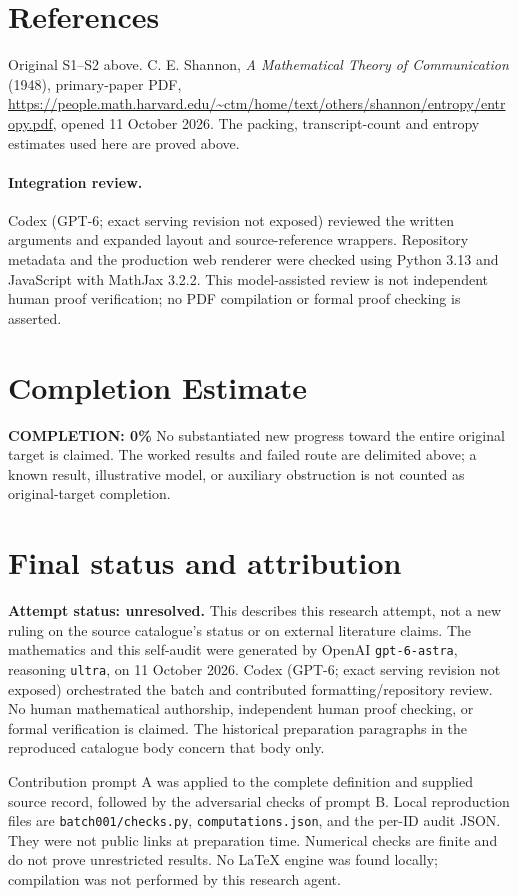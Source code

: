 \documentclass[11pt]{article}
\begin{document}
\section{References}
Original S1--S2 above. C. E. Shannon, \emph{A Mathematical Theory of Communication} (1948), primary-paper PDF, \url{https://people.math.harvard.edu/~ctm/home/text/others/shannon/entropy/entropy.pdf}, opened 11 October 2026. The packing, transcript-count and entropy estimates used here are proved above.


\paragraph{Integration review.} Codex (GPT-6; exact serving revision not exposed) reviewed the written arguments and expanded layout and source-reference wrappers. Repository metadata and the production web renderer were checked using Python 3.13 and JavaScript with MathJax 3.2.2. This model-assisted review is not independent human proof verification; no PDF compilation or formal proof checking is asserted.

\section{Completion Estimate}
\noindent\textbf{COMPLETION: 0\%}
No substantiated new progress toward the entire original target is claimed. The worked results and failed route are delimited above; a known result, illustrative model, or auxiliary obstruction is not counted as original-target completion.

\section{Final status and attribution}
\textbf{Attempt status: unresolved.} This describes this research attempt, not a new ruling on the source catalogue's status or on external literature claims.
The mathematics and this self-audit were generated by OpenAI \texttt{gpt-6-astra}, reasoning \texttt{ultra}, on 11 October 2026. Codex (GPT-6; exact serving revision not exposed) orchestrated the batch and contributed formatting/repository review. No human mathematical authorship, independent human proof checking, or formal verification is claimed. The historical preparation paragraphs in the reproduced catalogue body concern that body only.

Contribution prompt A was applied to the complete definition and supplied source record, followed by the adversarial checks of prompt B. Local reproduction files are \texttt{batch001/checks.py}, \texttt{computations.json}, and the per-ID audit JSON. They were not public links at preparation time. Numerical checks are finite and do not prove unrestricted results. No LaTeX engine was found locally; compilation was not performed by this research agent.
\end{document}
